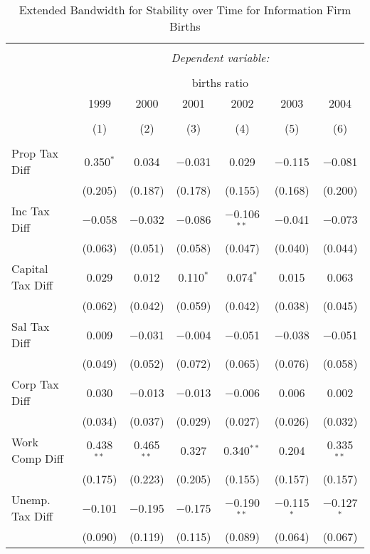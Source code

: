 
\begin{table}[!htbp] \centering 
  \caption{Extended Bandwidth for Stability over Time for  Information Firm Births} 
  \label{51 ebyear} 
\small 
\begin{tabular}{@{\extracolsep{5pt}}lcccccc} 
\\[-1.8ex]\hline 
\hline \\[-1.8ex] 
 & \multicolumn{6}{c}{\textit{Dependent variable:}} \\ 
\cline{2-7} 
\\[-1.8ex] & \multicolumn{6}{c}{births ratio} \\ 
 & 1999 & 2000 & 2001 & 2002 & 2003 & 2004 \\ 
\\[-1.8ex] & (1) & (2) & (3) & (4) & (5) & (6)\\ 
\hline \\[-1.8ex] 
 Prop Tax Diff & 0.350$^{*}$ & 0.034 & $-$0.031 & 0.029 & $-$0.115 & $-$0.081 \\ 
  & (0.205) & (0.187) & (0.178) & (0.155) & (0.168) & (0.200) \\ 
  Inc Tax Diff & $-$0.058 & $-$0.032 & $-$0.086 & $-$0.106$^{**}$ & $-$0.041 & $-$0.073 \\ 
  & (0.063) & (0.051) & (0.058) & (0.047) & (0.040) & (0.044) \\ 
  Capital Tax Diff & 0.029 & 0.012 & 0.110$^{*}$ & 0.074$^{*}$ & 0.015 & 0.063 \\ 
  & (0.062) & (0.042) & (0.059) & (0.042) & (0.038) & (0.045) \\ 
  Sal Tax Diff & 0.009 & $-$0.031 & $-$0.004 & $-$0.051 & $-$0.038 & $-$0.051 \\ 
  & (0.049) & (0.052) & (0.072) & (0.065) & (0.076) & (0.058) \\ 
  Corp Tax Diff & 0.030 & $-$0.013 & $-$0.013 & $-$0.006 & 0.006 & 0.002 \\ 
  & (0.034) & (0.037) & (0.029) & (0.027) & (0.026) & (0.032) \\ 
  Work Comp Diff & 0.438$^{**}$ & 0.465$^{**}$ & 0.327 & 0.340$^{**}$ & 0.204 & 0.335$^{**}$ \\ 
  & (0.175) & (0.223) & (0.205) & (0.155) & (0.157) & (0.157) \\ 
  Unemp. Tax Diff & $-$0.101 & $-$0.195 & $-$0.175 & $-$0.190$^{**}$ & $-$0.115$^{*}$ & $-$0.127$^{*}$ \\ 
  & (0.090) & (0.119) & (0.115) & (0.089) & (0.064) & (0.067) \\ 

\end{tabular}
\end{table}
